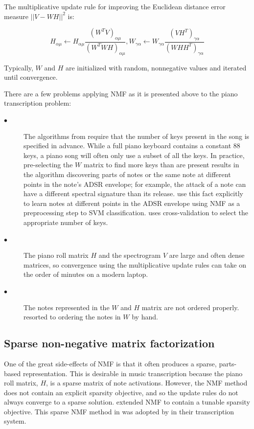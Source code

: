 \documentclass[5p]{elsarticle}
\begin{document}
The multiplicative update rule for improving the Euclidean distance error measure $||V-WH||^{2}$ is:

\[ H_{\alpha \mu} \leftarrow H_{\alpha \mu} \frac{ (W^{T} V)_{\alpha \mu}}{(W^{T} W H )_{\alpha \mu}}, W_{\gamma \alpha} \leftarrow W_{\gamma \alpha} \frac{ (V H^{T})_{\gamma \alpha}} {(W H H^{T})_{\gamma \alpha}} \]

\noindent Typically, $W$ and $H$ are initialized with random, nonnegative values and iterated until convergence. 



There are a few problems applying NMF as it is presented above to the piano transcription problem:


\begin{description}
\item[$\bullet$] The algorithms from \citet{seung2001algorithms} require that the number of keys present in the song is specified in advance. While a full piano keyboard contains a constant 88 keys, a piano song will often only use a subset of all the keys. In practice, pre-selecting the $W$ matrix to find more keys than are present results in the algorithm discovering parts of notes or the same note at different points in the note's ADSR envelope; for example, the attack of a note can have a different spectral signature than its release. \citet{weninger2013discriminative} use this fact explicitly to learn notes at different points in the ADSR envelope using NMF as a preprocessing step to SVM classification. \citet{} uses cross-validation to select the appropriate number of keys.
\item[$\bullet$] The piano roll matrix $H$ and the spectrogram $V$ are large and often dense matrices, so convergence using the multiplicative update rules can take on the order of minutes on a modern laptop. 
\item[$\bullet$] The notes represented in the $W$ and $H$ matrix are not ordered properly. \citet{} resorted to ordering the notes in $W$ by hand. 
\end{description}

\subsection{Sparse non-negative matrix factorization}

One of the great side-effects of NMF is that it often produces a sparse, parts-based representation. This is desirable in music transcription because the piano roll matrix, $H$, is a sparse matrix of note activations. However, the NMF method does not contain an explicit sparsity objective, and so the update rules do not always converge to a sparse solution. \citet{hoyer2004non} extended NMF to contain a tunable sparsity objective. This sparse NMF method in \citet{hoyer2004non} was adopted by \citet{abdallah2004polyphonic} in their transcription system. 
\end{document}
